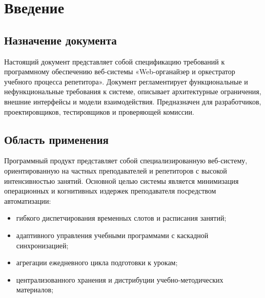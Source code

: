 \documentclass[12pt,a4paper]{article}
\begin{document}


\newpage
\tableofcontents
\newpage

\section{Введение}

\subsection{Назначение документа}
Настоящий документ представляет собой спецификацию требований к программному обеспечению веб-системы «Web-органайзер и оркестратор учебного процесса репетитора». Документ регламентирует функциональные и нефункциональные требования к системе, описывает архитектурные ограничения, внешние интерфейсы и модели взаимодействия. Предназначен для разработчиков, проектировщиков, тестировщиков и проверяющей комиссии.

\subsection{Область применения}
Программный продукт представляет собой специализированную веб-систему, ориентированную на частных преподавателей и репетиторов с высокой интенсивностью занятий. Основной целью системы является минимизация операционных и когнитивных издержек преподавателя посредством автоматизации:
\begin{itemize}
    \item гибкого диспетчирования временных слотов и расписания занятий;
    \item адаптивного управления учебными программами с каскадной синхронизацией;
    \item агрегации ежедневного цикла подготовки к урокам;
    \item централизованного хранения и дистрибуции учебно-методических материалов;
\end{itemize}
\end{document}
